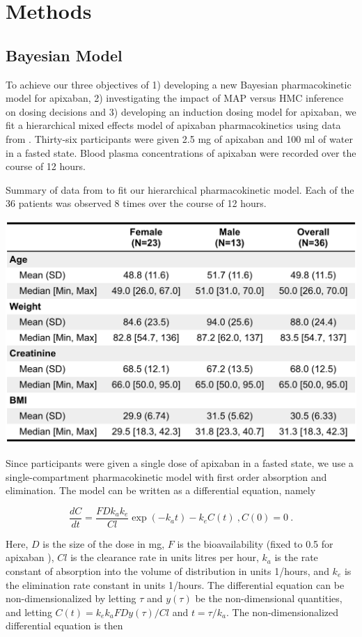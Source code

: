 \section{Methods}

\subsection*{Bayesian Model}

To achieve our three objectives of 1) developing a new Bayesian pharmacokinetic model for apixaban, 2) investigating the impact of MAP versus HMC inference on dosing decisions and 3) developing an induction dosing model for apixaban, we fit a hierarchical mixed effects model of apixaban pharmacokinetics using data from \cite{Beaton2018-el}.  Thirty-six participants were given 2.5 mg of apixaban and 100 ml of water in a fasted state. Blood plasma concentrations of apixaban were recorded over the course of 12 hours.



\begin{table}[htb]
	\centering
	\caption{Summary of data from  \cite{Beaton2018-el} to fit our hierarchical pharmacokinetic model.  Each of the 36 patients was observed 8 times over the course of 12 hours. } 
	\label{tab:my table} 
	\includegraphics[width=0.7\linewidth]{figures/table1}
\end{table}


\noindent Since participants were given a single dose of apixaban in a fasted state, we use a single-compartment pharmacokinetic model with first order absorption and elimination. The model can be written as a differential equation, namely

\begin{equation}
	\dfrac{dC}{dt} = \dfrac{FDk_ak_e}{Cl}\exp(-k_at) - k_e C(t) \>, C(0) = 0 \>.
\end{equation}

\noindent Here, $D$ is the size of the dose in mg, $F$ is the bioavailability (fixed to 0.5 for apixaban \cite{Byon2019-gf}), $\mathit{Cl}$ is the clearance rate in units litres per hour, $k_a$ is the rate constant of absorption into the volume of distribution in units 1/hours, and $k_e$ is the elimination rate constant in units 1/hours.  The differential equation can be non-dimensionalized by letting $\tau$ and $y(\tau)$ be the non-dimensional quantities, and letting $C(t) = k_ek_a FD y(\tau) / Cl$ and $t = \tau/k_a$.  The non-dimensionalized differential equation is then

